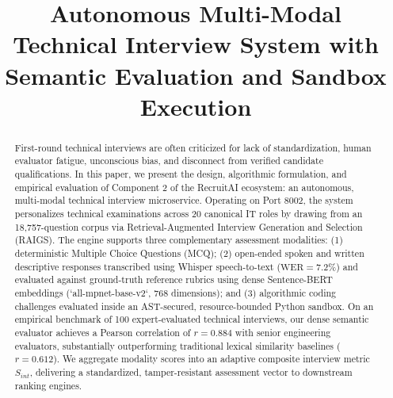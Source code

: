 \documentclass[conference]{IEEEtran}
\begin{document}
\title{Autonomous Multi-Modal Technical Interview System with Semantic Evaluation and Sandbox Execution}

\author{
}

\maketitle

\begin{abstract}
First-round technical interviews are often criticized for lack of standardization, human evaluator fatigue, unconscious bias, and disconnect from verified candidate qualifications. In this paper, we present the design, algorithmic formulation, and empirical evaluation of Component 2 of the RecruitAI ecosystem: an autonomous, multi-modal technical interview microservice. Operating on Port 8002, the system personalizes technical examinations across 20 canonical IT roles by drawing from an 18,757-question corpus via Retrieval-Augmented Interview Generation and Selection (RAIGS). The engine supports three complementary assessment modalities: (1) deterministic Multiple Choice Questions (MCQ); (2) open-ended spoken and written descriptive responses transcribed using Whisper speech-to-text ($\text{WER}=7.2\%$) and evaluated against ground-truth reference rubrics using dense Sentence-BERT embeddings (`all-mpnet-base-v2`, 768 dimensions); and (3) algorithmic coding challenges evaluated inside an AST-secured, resource-bounded Python sandbox. On an empirical benchmark of 100 expert-evaluated technical interviews, our dense semantic evaluator achieves a Pearson correlation of $r = 0.884$ with senior engineering evaluators, substantially outperforming traditional lexical similarity baselines ($r = 0.612$). We aggregate modality scores into an adaptive composite interview metric $S_{int}$, delivering a standardized, tamper-resistant assessment vector to downstream ranking engines.
\end{abstract}
\end{document}
